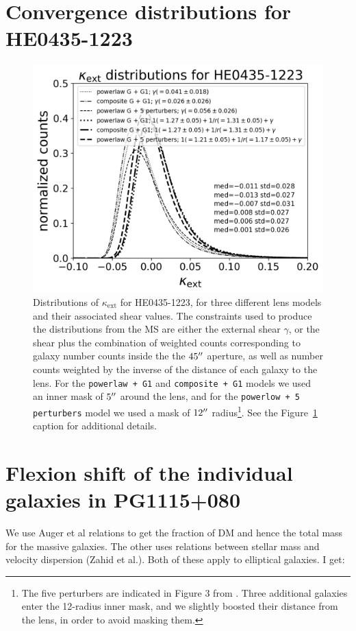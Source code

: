 \documentclass[useAMS,usenatbib]{mnras}
\begin{document}
\section{Convergence distributions for HE0435-1223}
\label{convergence_HE0435}
\begin{figure}
\includegraphics[width=\linewidth]{kappahistHE0435Chih-Fan.png}
\caption{Distributions of $\kappa_\mathrm{ext}$ for HE0435-1223, for three different lens models and their associated shear values. The constraints used to produce the distributions from the MS are either the external shear $\gamma$, or the shear plus the combination of weighted counts corresponding to galaxy number counts inside the the $45\hbox{$^{\prime\prime}$}$ aperture, as well as number counts weighted by the inverse of the distance of each galaxy to the lens. For the \texttt{powerlaw + G1} and \texttt{composite + G1} models we used an inner mask of $5\hbox{$^{\prime\prime}$}$ around the lens, and for the \texttt{powerlow + 5 perturbers} model we used a mask of $12\hbox{$^{\prime\prime}$}$ radius\protect\footnote{The five perturbers are indicated in Figure 3 from \citet{WongEtal17}. Three additional galaxies enter the 12\arcsec-radius inner mask, and we slightly boosted their distance from the lens, in order to avoid masking them.}. See the Figure~\ref{fig:kappaHE0435} caption for additional details.}
\label{fig:kappaHE0435}
\end{figure}

\section{Flexion shift of the individual galaxies in PG1115+080}
\label{flexion_shift}
We use Auger et al relations to get the fraction of DM and hence the total mass for the massive galaxies. The other uses relations between stellar mass and velocity dispersion (Zahid et al.). Both of these apply to elliptical galaxies. I get:
\end{document}
